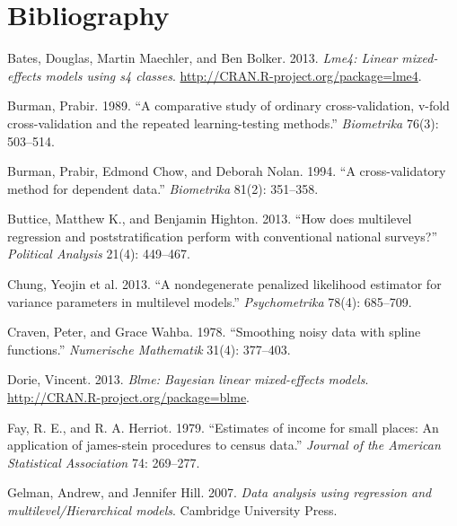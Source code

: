 \newpage

\section*{Bibliography}\label{bibliography}

Bates, Douglas, Martin Maechler, and Ben Bolker. 2013. \emph{Lme4:
Linear mixed-effects models using s4 classes}.
\url{http://CRAN.R-project.org/package=lme4}.

Burman, Prabir. 1989. ``A comparative study of ordinary
cross-validation, v-fold cross-validation and the repeated
learning-testing methods.'' \emph{Biometrika} 76(3): 503--514.

Burman, Prabir, Edmond Chow, and Deborah Nolan. 1994. ``A
cross-validatory method for dependent data.'' \emph{Biometrika} 81(2):
351--358.

Buttice, Matthew K., and Benjamin Highton. 2013. ``How does multilevel
regression and poststratification perform with conventional national
surveys?'' \emph{Political Analysis} 21(4): 449--467.

Chung, Yeojin et al. 2013. ``A nondegenerate penalized likelihood
estimator for variance parameters in multilevel models.''
\emph{Psychometrika} 78(4): 685--709.

Craven, Peter, and Grace Wahba. 1978. ``Smoothing noisy data with spline
functions.'' \emph{Numerische Mathematik} 31(4): 377--403.

Dorie, Vincent. 2013. \emph{Blme: Bayesian linear mixed-effects models}.
\url{http://CRAN.R-project.org/package=blme}.

Fay, R. E., and R. A. Herriot. 1979. ``Estimates of income for small
places: An application of james-stein procedures to census data.''
\emph{Journal of the American Statistical Association} 74: 269--277.

Gelman, Andrew, and Jennifer Hill. 2007. \emph{Data analysis using
regression and multilevel/Hierarchical models}. Cambridge University
Press.

